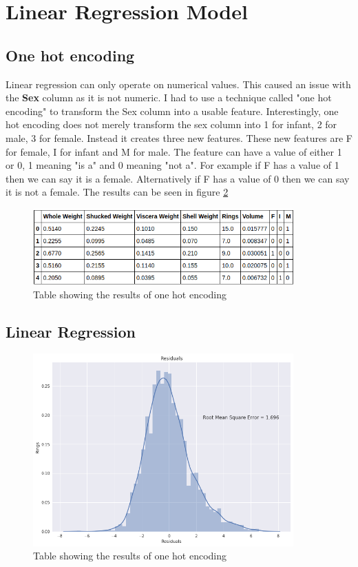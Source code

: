 \section{Linear Regression Model}

\subsection{One hot encoding}

Linear regression can only operate on numerical values. This caused an issue with the \textbf{Sex} column as it is not numeric. I had to use a technique called "one hot encoding" to transform the Sex column into a usable feature. Interestingly, one hot encoding does not merely transform the sex column into 1 for infant, 2 for male, 3 for female. Instead it creates three new features. These new features are F for female, I for infant and M for male. The feature can have a value of either 1 or 0, 1 meaning "is a" and 0 meaning "not a". For example if F has a value of 1 then we can say it is a female. Alternatively if F has a value of 0 then we can say it is not a female. The results can be seen in figure \ref{fig:abalone-one-hot-encoding}
\begin{figure}[H]
  \centering
  \includegraphics[scale=0.5,width=100mm]{./images/abalone-one-hot-encoding.png}
  \caption{Table showing the results of one hot encoding}
  \label{fig:abalone-one-hot-encoding}
\end{figure}

\subsection{Linear Regression}

\begin{figure}[H]
  \centering
  \includegraphics[scale=0.5,width=100mm]{./images/abalone-linear-regression-hist.png}
  \caption{Table showing the results of one hot encoding}
  \label{fig:abalone-one-hot-encoding}
\end{figure}